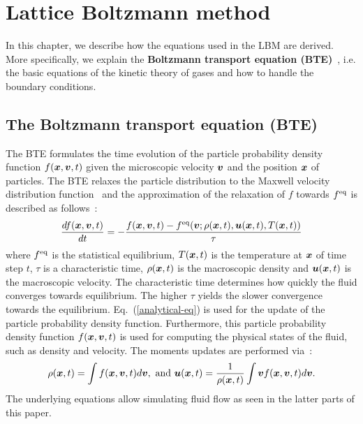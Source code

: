 \chapter{Lattice Boltzmann method}
\vspace{-8mm}
In this chapter, we describe how the equations used in the LBM
are derived.
More specifically, we explain
the {\bf Boltzmann transport equation (BTE)}~\cite{mcnamara1988use}, i.e.
the basic equations of the kinetic theory of gases and
how to handle the boundary conditions.

\section{The Boltzmann transport equation (BTE)}
The BTE formulates the time evolution of the 
particle probability density function $f(\boldsymbol{x}, \boldsymbol{v}, t)$ given
the microscopic velocity $\boldsymbol{v}$ and the position $\boldsymbol{x}$ of particles.
The BTE relaxes the particle distribution to
the Maxwell velocity distribution
function~\cite{huang1963statistical} and the approximation of the relaxation of
$f$ towards $f^{\rm eq}$ is described as follows~\cite{bhatnagar1954model}:
\begin{equation}
  \begin{aligned}
    \frac{d f(\boldsymbol{x}, \boldsymbol{v}, t)}{d t} &= 
    - \frac{
      f(\boldsymbol{x}, \boldsymbol{v}, t) - f^{\rm eq}(\boldsymbol{v}; \rho(\boldsymbol{x}, t), \boldsymbol{u}(\boldsymbol{x}, t), T(\boldsymbol{x}, t))
      }{\tau} \\
    \end{aligned}
    \label{analytical-eq}
  \end{equation}
where $f^{\rm eq}$ is the statistical equilibrium,
$T(\boldsymbol{x}, t)$ is the temperature at $\boldsymbol{x}$
of time step $t$,
$\tau$ is a characteristic time, $\rho(\boldsymbol{x}, t)$ is the macroscopic density
and $\boldsymbol{u}(\boldsymbol{x}, t)$ is the macroscopic velocity.
The characteristic time determines how quickly
the fluid converges towards equilibrium.
The higher $\tau$ yields the slower 
convergence towards the equilibrium.
Eq.~(\ref{analytical-eq}) is used for the update 
of the particle probability density function.
Furthermore, this particle probability density function
$f(\boldsymbol{x}, \boldsymbol{v}, t)$ is used for computing
the physical states of the fluid,
such as density and velocity.
The moments updates are performed via~\cite{caroli1984non}:
\begin{equation}
  \begin{aligned}
    \rho(\boldsymbol{x}, t) = \int f(\boldsymbol{x}, \boldsymbol{v}, t) d\boldsymbol{v},  \text{ and }
    \boldsymbol{u}(\boldsymbol{x}, t) = \frac{1}{\rho(\boldsymbol{x}, t)} \int \boldsymbol{v} f(\boldsymbol{x}, \boldsymbol{v}, t)  d\boldsymbol{v}. 
  \end{aligned}
  \label{analytical-update}
\end{equation}
The underlying equations allow simulating
fluid flow as seen in the latter parts of this paper.

